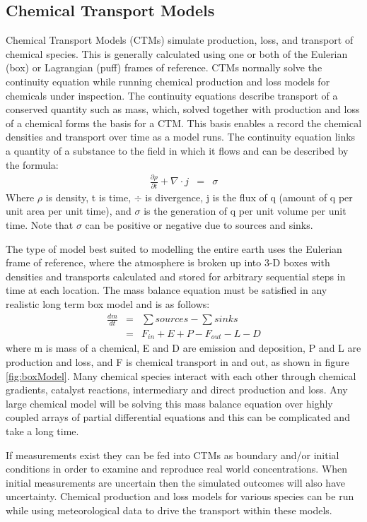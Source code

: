 \subsection{Chemical Transport Models}
Chemical Transport Models (CTMs) simulate production, loss, and transport of chemical species.
This is generally calculated using one or both of the Eulerian (box) or Lagrangian (puff) frames of reference.
CTMs normally solve the continuity equation while running chemical production and loss models for chemicals under inspection. 
The continuity equations describe transport of a conserved quantity such as mass, which, solved together with production and loss of a chemical forms the basis for a CTM.
This basis enables a record the chemical densities and transport over time as a model runs.
The continuity equation links a quantity of a substance to the field in which it flows and can be described by the formula:
\begin{eqnarray*}
    \frac{\partial \rho}{\partial t} + \nabla \cdot j &=& \sigma 
\end{eqnarray*}
Where $\rho$ is density, t is time, $\div$ is divergence, j is the flux of q (amount of q per unit area per unit time), and $\sigma$ is the generation of q per unit volume per unit time.
Note that $\sigma$ can be positive or negative due to sources and sinks.

The type of model best suited to modelling the entire earth uses the Eulerian frame of reference, where the atmosphere is broken up into 3-D boxes with densities and transports calculated and stored for arbitrary sequential steps in time at each location.
The mass balance equation must be satisfied in any realistic long term box model and is as follows: 
\begin{eqnarray*}
    \frac{dm}{dt} &=& \sum{sources}-\sum{sinks} \\
    &=& F_{in} + E + P - F_{out} - L - D 
\end{eqnarray*}
where m is mass of a chemical, E and D are emission and deposition, P and L are production and loss, and F is chemical transport in and out, as shown in figure \ref{fig:boxModel}.
Many chemical species interact with each other through chemical gradients, catalyst reactions, intermediary and direct production and loss. 
Any large chemical model will be solving this mass balance equation over highly coupled arrays of partial differential equations and this can be complicated and take a long time.

If measurements exist they can be fed into CTMs as boundary and/or initial conditions in order to examine and reproduce real world concentrations.
When initial measurements are uncertain then the simulated outcomes will also have uncertainty.
Chemical production and loss models for various species can be run while using meteorological data to drive the transport within these models.

